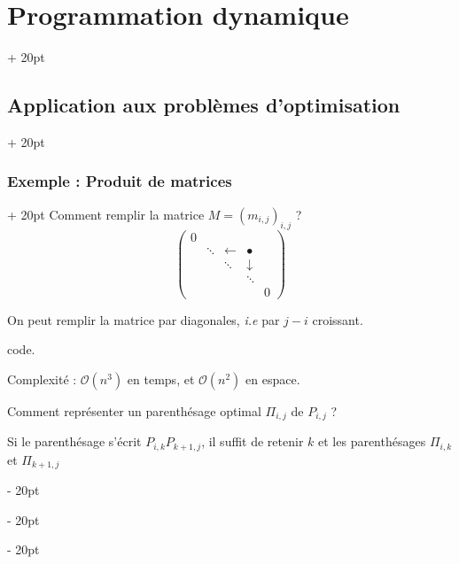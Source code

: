 \documentclass[a4paper, 12pt, twoside]{article}
\newcommand{\ind}[1][20pt]{\advance\leftskip + #1}
\newcommand{\deind}[1][20pt]{\advance\leftskip - #1}
\newenvironment{indt}[2][20pt]{#2 \par \ind[#1]}{\par \deind} %
\begin{document}
\begin{indt}{\section{Programmation dynamique}}
\begin{indt}{\subsection{Application aux problèmes d'optimisation}}
\begin{indt}{\subsubsection{Exemple : Produit de matrices}}
                Comment remplir la matrice $M = (m_{i,j})_{i,j}$ ?
                    \[
                        \begin{pmatrix}
                            0
                            \\
                            & \ddots & \leftarrow & \bullet
                            \\
                            & & \ddots & \downarrow
                            \\
                            & & & \ddots
                            \\
                            & & & & 0
                        \end{pmatrix}
                    \]
                
                On peut remplir la matrice par diagonales, \textit{i.e} par $j - i$ croissant.
                
                 code.
                
                \vspace{12pt}
                
                Complexité : $\mathcal O(n^3)$ en temps, et $\mathcal O(n^2)$ en espace.
                
                \vspace{12pt}
                
                Comment représenter un parenthésage optimal $\Pi_{i, j}$ de $P_{i, j}$ ?
                
                Si le parenthésage s'écrit $P_{i, k} P_{k + 1, j}$, il suffit de retenir $k$ et les parenthésages $\Pi_{i, k}$ et $\Pi_{k + 1, j}$
                
                \begin{center}
                \end{center}
            \end{indt}
        \end{indt}
        
    \end{indt}
    
\end{document}
